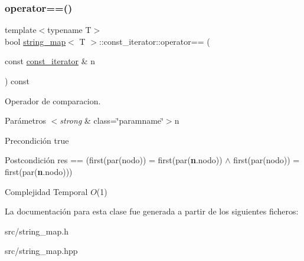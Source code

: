 \subsubsection{\texorpdfstring{operator==()}{operator==()}}
{\footnotesize\ttfamily template$<$typename T$>$ \\
bool \mbox{\hyperlink{classstring__map}{string\+\_\+map}}$<$ T $>$\+::const\+\_\+iterator\+::operator== (\begin{DoxyParamCaption}\item[{const \mbox{\hyperlink{classstring__map_1_1const__iterator}{const\+\_\+iterator}} \&}]{n }\end{DoxyParamCaption}) const\hspace{0.3cm}{\ttfamily [inline]}}



Operador de comparacion. 


\begin{DoxyParams}{Parámetros}
{\em $<$strong} & class=\char`\"{}paramname\char`\"{}$>$n\\
\hline
\end{DoxyParams}
\begin{DoxyPrecond}{Precondición}
true 
\end{DoxyPrecond}
\begin{DoxyPostcond}{Postcondición}
res == (first(par(nodo)) = first(par({\bfseries n}.nodo)) $\land$ first(par(nodo)) = first(par({\bfseries n}.nodo)))
\end{DoxyPostcond}

\begin{DoxyDescription}
\item[Complejidad Temporal]$O$(1)
\end{DoxyDescription}

La documentación para esta clase fue generada a partir de los siguientes ficheros\+:\begin{DoxyCompactItemize}
\item 
src/string\+\_\+map.\+h\item 
src/string\+\_\+map.\+hpp\end{DoxyCompactItemize}
